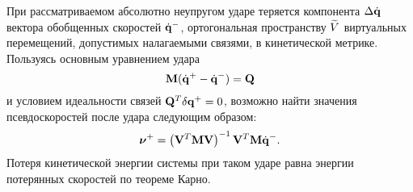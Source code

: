 
При рассматриваемом абсолютно неупругом ударе теряется компонента $\Delta\dot{\mathbf{q}}$ вектора обобщенных скоростей $\dot{\mathbf{q}}^-$, ортогональная пространству $\widetilde{V}$ виртуальных перемещений, допустимых налагаемыми связями, в кинетической метрике. Пользуясь основным уравнением удара
\begin{equation}\label{eq:udar_general}
    \mathbf{M} (\dot{\mathbf{q}}^+ - \dot{\mathbf{q}}^-) = \mathbf{Q}
\end{equation}
и условием идеальности связей $\mathbf{Q}^T \delta\mathbf{q}^+ = 0$, возможно найти значения псевдоскоростей после удара следующим образом:
\begin{equation*}
\boldsymbol{\mathbf{\nu}}^+ = \left( \mathbf{V}^T\mathbf{M}\mathbf{V} \right)^{-1}\mathbf{V}^T\mathbf{M}\dot{\mathbf{q}}^-.
\end{equation*}
Потеря кинетической энергии системы при таком ударе равна энергии потерянных скоростей по теореме Карно.






